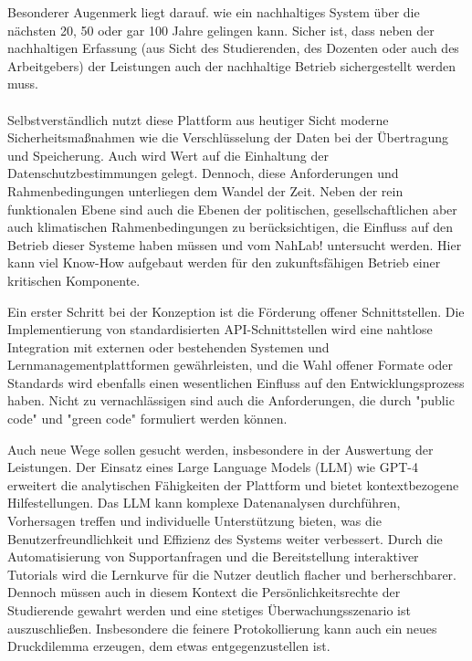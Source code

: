 \documentclass[conference]{IEEEtran}
\begin{document}
Besonderer Augenmerk liegt darauf. wie ein nachhaltiges System über die nächsten 20, 50 oder gar 100 Jahre gelingen kann. Sicher ist, dass neben der nachhaltigen Erfassung (aus Sicht des Studierenden, des Dozenten oder auch des Arbeitgebers) der Leistungen auch der nachhaltige Betrieb sichergestellt werden muss. 
\\\\
Selbstverständlich nutzt diese Plattform aus heutiger Sicht moderne Sicherheitsmaßnahmen wie die Verschlüsselung der Daten bei der Übertragung und Speicherung. Auch wird Wert auf die Einhaltung der Datenschutzbestimmungen gelegt. Dennoch, diese Anforderungen und Rahmenbedingungen unterliegen dem Wandel der Zeit. Neben der rein funktionalen Ebene sind auch die Ebenen der politischen, gesellschaftlichen aber auch klimatischen Rahmenbedingungen zu berücksichtigen, die Einfluss auf den Betrieb dieser Systeme haben müssen und vom NahLab! untersucht werden. Hier kann viel Know-How aufgebaut werden für den zukunftsfähigen Betrieb einer kritischen Komponente.

Ein erster Schritt bei der Konzeption ist die Förderung offener Schnittstellen. Die Implementierung von standardisierten API-Schnittstellen wird eine nahtlose Integration mit externen oder bestehenden Systemen und Lernmanagementplattformen gewährleisten, und die Wahl offener Formate oder Standards wird ebenfalls einen wesentlichen Einfluss auf den Entwicklungsprozess haben. Nicht zu vernachlässigen sind auch die Anforderungen, die durch "public code" und "green code" formuliert werden können.

Auch neue Wege sollen gesucht werden, insbesondere in der Auswertung der Leistungen. Der Einsatz eines Large Language Models (LLM) wie GPT-4 erweitert die analytischen Fähigkeiten der Plattform und bietet kontextbezogene Hilfestellungen. Das LLM kann komplexe Datenanalysen durchführen, Vorhersagen treffen und individuelle Unterstützung bieten, was die Benutzerfreundlichkeit und Effizienz des Systems weiter verbessert. Durch die Automatisierung von Supportanfragen und die Bereitstellung interaktiver Tutorials wird die Lernkurve für die Nutzer deutlich flacher und berherschbarer. Dennoch müssen auch in diesem Kontext die Persönlichkeitsrechte der Studierende gewahrt werden und eine stetiges Überwachungsszenario ist auszuschließen. Insbesondere die feinere Protokollierung kann auch ein neues Druckdilemma erzeugen, dem etwas entgegenzustellen ist. 
\end{document}
